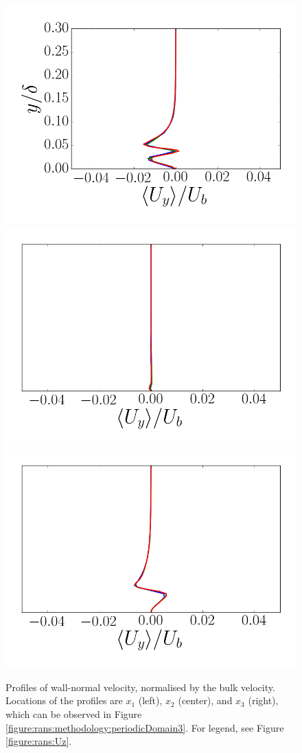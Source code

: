 \documentclass[12pt,oneside,a4paper]{article}
\begin{document}
\begin{figure}
\centering
\includegraphics[width=0.33\linewidth]{images/CFD_meshIndependence/X1_Uy.png}\hfill \includegraphics[width=0.33\linewidth]{images/CFD_meshIndependence/X2_Uy.png}\hfill
\includegraphics[width=0.33\linewidth]{images/CFD_meshIndependence/X3_Uy.png}\hfill
\caption{Profiles of wall-normal velocity, normalised by the bulk velocity. Locations of the profiles are $x_1$ (left), $x_2$ (center), and $x_3$ (right), which can be observed in Figure \ref{figure:rans:methodology:periodicDomain3}. For legend, see Figure \ref{figure:rans:Uz}.}
\label{figure:rans:Uy}
\end{figure}
\end{document}
